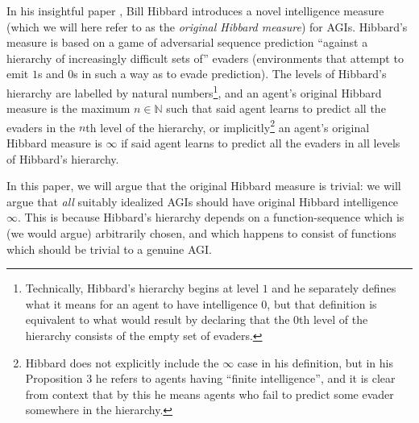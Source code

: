 \documentclass{article}
\begin{document}
In his insightful paper \cite{hibbard}, Bill Hibbard introduces a novel
intelligence measure (which we will here refer to as the \emph{original Hibbard measure})
for AGIs.
Hibbard's measure is based on a game of adversarial sequence
prediction \cite{hibbard2008adversarial}
``against a hierarchy of increasingly difficult sets of'' evaders (environments that attempt
to emit $1$s and $0$s in such a way as to evade prediction).
The levels of Hibbard's hierarchy are labelled by natural numbers\footnote{Technically,
Hibbard's hierarchy begins at level $1$ and he separately defines what it means for
an agent to have intelligence $0$, but that definition is equivalent to what would result
by declaring that the $0$th level of the hierarchy consists of the empty set of evaders.}, and
an agent's original Hibbard measure is the maximum $n\in\mathbb N$ such that
said agent learns to predict all the evaders in the $n$th level of the hierarchy,
or implicitly\footnote{Hibbard does not explicitly include the $\infty$ case in his
definition, but in his Proposition 3 he refers to agents having ``finite intelligence'', and
it is clear from context that by this he means agents who fail to predict some evader
somewhere in the hierarchy.} an agent's original Hibbard measure is $\infty$
if said agent learns to predict all the evaders in all levels of Hibbard's hierarchy.

In this paper, we will argue that the original Hibbard measure is
trivial: we will argue that \emph{all} suitably idealized AGIs should have
original Hibbard intelligence $\infty$. This is because Hibbard's hierarchy
depends on a function-sequence which is (we would argue) arbitrarily chosen,
and which happens to consist of functions which should be trivial to a genuine AGI.
\end{document}
